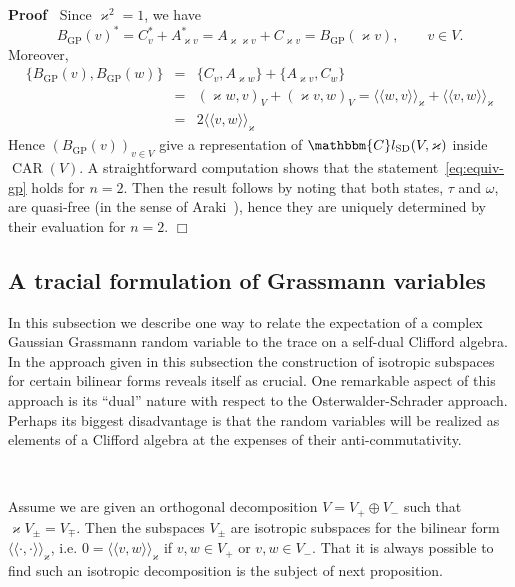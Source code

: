 \documentclass[11pt]{article}
\newcommand{\llangle}{{\langle\!\langle}}
\newcommand{\rrangle}{{\rangle\!\rangle}}
\newcommand{\tmop}[1]{\ensuremath{\operatorname{#1}}}
\newenvironment{proof}{\noindent\textbf{Proof\ }}{\hspace*{\fill}$\Box$\medskip}
\begin{document}
\begin{proof}
  Since $\varkappa^2 = 1$, we have
  \[ B_{\tmop{GP}} (v)^{\ast} = C_v^{\ast} + A_{\varkappa v}^{\ast} =
     A_{\varkappa \varkappa v} + C_{\varkappa v} = B_{\tmop{GP}} (\varkappa
     v), \qquad v \in V. \]
  Moreover,
  \begin{eqnarray*}
    \{ B_{\tmop{GP}} (v), B_{\tmop{GP}} (w) \} & = & \{ C_v, A_{\varkappa w}
    \} + \{ A_{\varkappa v}, C_w \}\\
    & = & (\varkappa w, v)_V + (\varkappa v, w)_V = \llangle w, v
    \rrangle_{\varkappa} + \llangle v, w \rrangle_{\varkappa}\\
    & = & 2 \llangle v, w \rrangle_{\varkappa}
  \end{eqnarray*}
  Hence $(B_{\tmop{GP}} (v))_{v \in V}$ give a representation of
  $\mathbbm{C}l_{\tmop{SD}} (V, \varkappa)$ inside $\tmop{CAR} (V)$. A
  straightforward computation shows that the statement~{\eqref{eq:equiv-gp}}
  holds for $n = 2$. Then the result follows by noting that both states,
  $\tau$ and $\omega$, are quasi-free (in the sense of
  Araki~{\cite{araki_quasifree_1970}}), hence they are uniquely determined by
  their evaluation for $n = 2$.
\end{proof}

\subsection{A tracial formulation of Grassmann variables}

In this subsection we describe one way to relate the expectation of a complex
Gaussian Grassmann random variable to the trace on a self-dual Clifford
algebra. In the approach given in this subsection the construction of
isotropic subspaces for certain bilinear forms reveals itself as crucial. One
remarkable aspect of this approach is its ``dual'' nature with respect to the
Osterwalder-Schrader approach. Perhaps its biggest disadvantage is that the
random variables will be realized as elements of a Clifford algebra at the
expenses of their anti-commutativity.

\

Assume we are given an orthogonal decomposition $V = V_+ \oplus V_-$ such
that $\varkappa V_{\pm} = V_{\mp}$. Then the subspaces $V_{\pm}$ are isotropic
subspaces for the bilinear form $\llangle \cdot, \cdot \rrangle_{\varkappa}$,
i.e. $0 = \llangle v, w \rrangle_{\varkappa}$ if $v, w \in V_+$ or $v, w \in
V_-$. That it is always possible to find such an isotropic decomposition is
the subject of next proposition.
\end{document}
